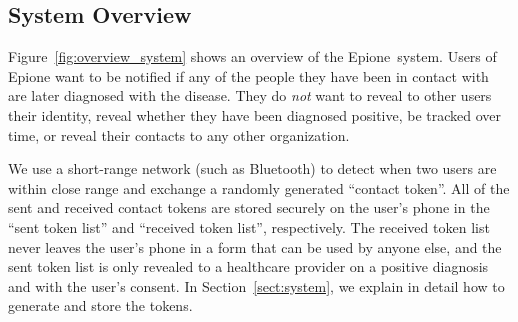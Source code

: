 \documentclass[11pt]{article} %
\newcommand{\sectionref}[1]{Section~\ref{#1}}
\newcommand{\figureref}[1]{Figure~\ref{#1}}
\newcommand{\dect}{\textsf{Epione}\xspace}
\newcommand{\psica}{PSI-CA\xspace}
\newcommand{\remove}[1]{}
\begin{document}
\remove{

In summary, we make the following contributions:
\begin{itemize}
	\item We design \dect, an efficient high-performance contact tracing system that provides strong privacy guarantees, specifically that user contact information is not revealed beyond what is desired to any party and that the diagnosis status is revealed only to health authorities. The system prevents all important attacks, such as linkage attacks (e.g. infection status, social graph exposure), and false-positive claims, to which current models underpinning related work are vulnerable.
	
	\item We propose a new semi-honest private set intersection cardinality (\psica) primitive for sets of different sizes. %
	Our \psica protocol has communication cost linear in the size of the smaller set ($n$), and logarithmic in the larger set size $N$. More precisely, if the set sizes are $n << N$, we achieve a communication overhead of $O(n \log N)$. 
\end{itemize}
}


\subsection{System Overview}
\label{subs:system_overview}


\figureref{fig:overview_system} shows an overview of the \dect\ system. Users of \dect want to be notified if any of the people they have been in contact with are later diagnosed with the disease. They do \textit{not} want to reveal to other users their identity, reveal whether they have been diagnosed positive, be tracked over time, or reveal their contacts to any other organization.

We use a short-range network (such as Bluetooth) to detect when two users are within close range and exchange a randomly generated ``contact token''. All of the sent and received contact tokens are stored securely on the user's phone in the ``sent token list'' and ``received token list'', respectively. The received token list never leaves the user's phone in a form that can be used by anyone else, and the sent token list is only revealed to a healthcare provider on a positive diagnosis and with the user's consent. In \sectionref{sect:system}, we explain in detail how to generate and store the tokens.
\end{document}

